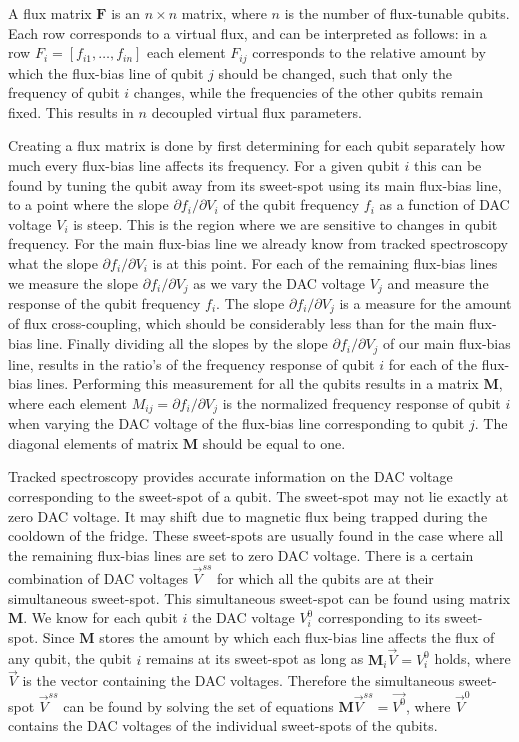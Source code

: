         A flux matrix $\boldsymbol{F}$ is an $n \times n$ matrix, where $n$ is the number of flux-tunable qubits. Each row corresponds to a virtual flux, and can be interpreted as follows: in a row $F_i = \left[f_{i1}, \dots, f_{in}\right]$ each element $F_{ij}$ corresponds to the relative amount by which the flux-bias line of qubit $j$ should be changed, such that only the frequency of qubit $i$ changes, while the frequencies of the other qubits remain fixed. This results in $n$ decoupled virtual flux parameters.

        Creating a flux matrix is done by first determining for each qubit separately how much every flux-bias line affects its frequency. For a given qubit $i$ this can be found by tuning the qubit away from its sweet-spot using its main flux-bias line, to a point where the slope $\partial f_i/\partial V_i$ of the qubit frequency $f_i$ as a function of DAC voltage $V_i$ is steep. This is the region where we are sensitive to changes in qubit frequency. For the main flux-bias line we already know from tracked spectroscopy what the slope $\partial f_i / \partial V_i$ is at this point. For each of the remaining flux-bias lines we measure the slope $\partial f_i / \partial V_j$ as we vary the DAC voltage $V_j$ and measure the response of the qubit frequency $f_i$. The slope $\partial f_i / \partial V_j$ is a measure for the amount of flux cross-coupling, which should be considerably less than for the main flux-bias line. Finally dividing all the slopes by the slope $\partial f_i / \partial V_j$ of our main flux-bias line, results in the ratio's of the frequency response of qubit $i$ for each of the flux-bias lines. Performing this measurement for all the qubits results in a matrix $\boldsymbol{M}$, where each element $M_{ij}=\partial f_i / \partial V_j$ is the normalized frequency response of qubit $i$ when varying the DAC voltage of the flux-bias line corresponding to qubit $j$. The diagonal elements of matrix $\boldsymbol{M}$ should be equal to one.

        Tracked spectroscopy provides accurate information on the DAC voltage corresponding to the sweet-spot of a qubit. The sweet-spot may not lie exactly at zero DAC voltage. It may shift due to magnetic flux being trapped during the cooldown of the fridge. These sweet-spots are usually found in the case where all the remaining flux-bias lines are set to zero DAC voltage. There is a certain combination of DAC voltages $\vec{V}^{ss}$ for which all the qubits are at their simultaneous sweet-spot. This simultaneous sweet-spot can be found using matrix $\boldsymbol{M}$. We know for each qubit $i$ the DAC voltage $V^0_i$ corresponding to its sweet-spot. Since $\boldsymbol{M}$ stores the amount by which each flux-bias line affects the flux of any qubit, the qubit $i$ remains at its sweet-spot as long as $\boldsymbol{M}_i \vec{V}=V^0_i$ holds, where $\vec{V}$ is the vector containing the DAC voltages. Therefore the simultaneous sweet-spot $\vec{V}^{ss}$ can be found by solving the set of equations $\boldsymbol{M} \vec{V}^{ss} = \vec{V^0}$, where $\vec{V}^0$ contains the DAC voltages of the individual sweet-spots of the qubits.

